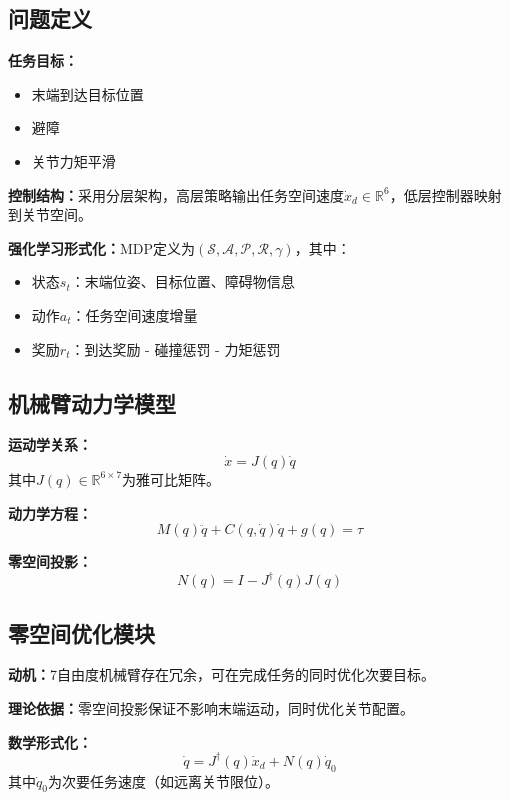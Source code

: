 \documentclass{article}
\begin{document}
\subsection{问题定义}

\textbf{任务目标：}
\begin{itemize}
\item 末端到达目标位置
\item 避障
\item 关节力矩平滑
\end{itemize}

\textbf{控制结构：}采用分层架构，高层策略输出任务空间速度$\dot{x}_d \in \mathbb{R}^6$，低层控制器映射到关节空间。

\textbf{强化学习形式化：}MDP定义为$(\mathcal{S}, \mathcal{A}, \mathcal{P}, \mathcal{R}, \gamma)$，其中：
\begin{itemize}
\item 状态$s_t$：末端位姿、目标位置、障碍物信息
\item 动作$a_t$：任务空间速度增量
\item 奖励$r_t$：到达奖励 - 碰撞惩罚 - 力矩惩罚
\end{itemize}

\subsection{机械臂动力学模型}

\textbf{运动学关系：}
\begin{equation}
\dot{x} = J(q)\dot{q}
\end{equation}
其中$J(q) \in \mathbb{R}^{6 \times 7}$为雅可比矩阵。

\textbf{动力学方程：}
\begin{equation}
M(q)\ddot{q} + C(q,\dot{q})\dot{q} + g(q) = \tau
\end{equation}

\textbf{零空间投影：}
\begin{equation}
N(q) = I - J^\dagger(q)J(q)
\end{equation}

\subsection{零空间优化模块}

\textbf{动机：}7自由度机械臂存在冗余，可在完成任务的同时优化次要目标。

\textbf{理论依据：}零空间投影保证不影响末端运动，同时优化关节配置。

\textbf{数学形式化：}
\begin{equation}
\dot{q} = J^\dagger(q)\dot{x}_d + N(q)\dot{q}_0
\end{equation}
其中$\dot{q}_0$为次要任务速度（如远离关节限位）。
\end{document}
